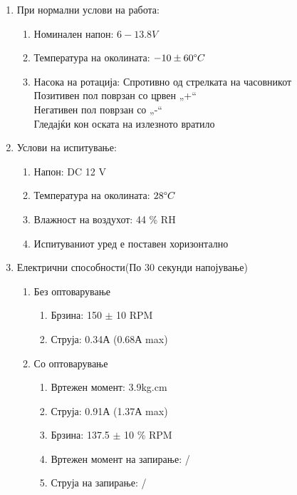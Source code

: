 \documentclass[12pt]{article}
\begin{document}
		  \renewcommand{\theenumii}{\arabic{enumii}}
      \renewcommand{\theenumiii}{\arabic{enumiii}}
	    \begin{enumerate}
        \item При нормални услови на работа:
          \begin{enumerate}
            \item Номинален напон: $ 6-13.8 V $
					  \item Температура на околината: $ -10 \pm 60 \degree C $
					  \item Насока на ротација: Спротивно од стрелката на часовникот\\Позитивен пол поврзан со црвен „+“\\Негативен пол поврзан со „-“\\Гледајќи кон оската на излезното вратило
					  \end{enumerate}
		    \item Услови на испитување:
          \begin{enumerate}
            \item Напон: DC 12 V
            \item Температура на околината: $ 28 \degree C $
            \item Влажност на воздухот: 44 \% RH
            \item Испитуваниот уред е поставен хоризонтално
            \end{enumerate}
	  	  \item Електрични способности(По 30 секунди напојување)
        	\begin{enumerate}
            \item Без оптоварување
              \begin{enumerate}
                \item Брзина: 150 $\pm$ 10 RPM
                \item Струја: 0.34А (0.68А max)
                \end{enumerate}
				    \item Со оптоварување
              \begin{enumerate}
                \item Вртежен момент: 3.9kg.cm
                \item Струја: 0.91А (1.37А max)
                \item Брзина: 137.5 $\pm$ 10 \% RPM
                \item Вртежен момент на запирање: /
                \item Струја на запирање: /

\end{enumerate}
\end{enumerate}
\end{enumerate}
\end{document}
